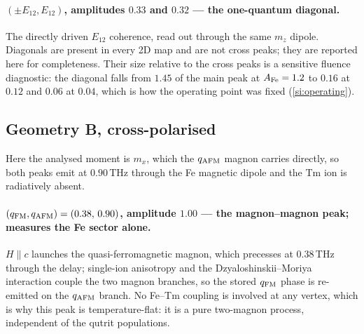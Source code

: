 \documentclass[11pt]{article}
\newcommand{\qafm}{q_{\rm AFM}}
\newcommand{\qfm}{q_{\rm FM}}
\begin{document}
\paragraph{$(\pm E_{12},E_{12})$, amplitudes $0.33$ and $0.32$ --- the
one-quantum diagonal.}
The directly driven $E_{12}$ coherence, read out through the same
$m_z$ dipole.  Diagonals are present in every 2D map and are not
cross peaks; they are reported here for completeness.  Their size
relative to the cross peaks is a sensitive fluence diagnostic: the
diagonal falls from $1.45$ of the main peak at $A_{\rm Fe}=1.2$ to
$0.16$ at $0.12$ and $0.06$ at $0.04$, which is how the operating point
was fixed (\cref{si:operating}).

\subsection{Geometry B, cross-polarised}
\label{si:peaksBcross}

Here the analysed moment is $m_x$, which the $\qafm$ magnon carries
directly, so both peaks emit at $0.90$\,THz through the Fe magnetic
dipole and the Tm ion is radiatively absent.

\paragraph{$(\qfm,\qafm)=(0.38,\,0.90)$, amplitude $1.00$ --- the
magnon--magnon peak; measures the Fe sector alone.}
$H\!\parallel\!c$ launches the quasi-ferromagnetic magnon, which
precesses at $0.38$\,THz through the delay; single-ion anisotropy and
the Dzyaloshinskii--Moriya interaction couple the two magnon branches,
so the stored $\qfm$ phase is re-emitted on the $\qafm$ branch.  No
Fe--Tm coupling is involved at any vertex, which is why this peak is
temperature-flat: it is a pure two-magnon process, independent of the
qutrit populations.
\end{document}
